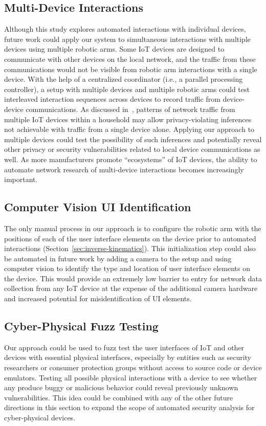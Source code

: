 \subsection{Multi-Device Interactions}
Although this study explores automated interactions with individual devices, future work could apply our system to simultaneous interactions with multiple devices using multiple robotic arms. 
Some IoT devices are designed to communicate with other devices on the local network, and the traffic from these communications would not be visible from robotic arm interactions with a single device. With the help of a centralized coordinator (i.e., a parallel processing controller), a setup with multiple devices and multiple robotic arms could test interleaved interaction sequences across devices to record traffic from device-device communications. 
As discussed in~\cite{apthorpe2019keeping}, patterns of network traffic from multiple IoT devices within a household may allow privacy-violating inferences not achievable with traffic from a single device alone. 
Applying our approach to multiple devices could test the possibility of such inferences and potentially reveal other privacy or security vulnerabilities related to local device communications as well. 
As more manufacturers promote ``ecosystems'' of IoT devices, the ability to automate network research of multi-device interactions becomes increasingly important. 

\subsection{Computer Vision UI Identification}
The only manual process in our approach is to configure the robotic arm with the positions of each of the user interface elements on the device prior to automated interactions (Section~\ref{sec:inverse-kinematics}). This initialization step could also be automated in future work by adding a camera to the setup and using computer vision to identify the type and location of user interface elements on the device. This would provide an extremely low barrier to entry for network data collection from any IoT device at the expense of the additional camera hardware and increased potential for misidentification of UI elements. 

\subsection{Cyber-Physical Fuzz Testing}
Our approach could be used to fuzz test the user interfaces of IoT and other devices with essential physical interfaces, especially by entities such as security researchers or consumer protection groups without access to source code or device emulators. 
Testing all possible physical interactions with a device to see whether any produce buggy or malicious behavior could reveal previously unknown vulnerabilities. This idea could be combined with any of the other future directions in this section to expand the scope of automated security analysis for cyber-physical devices. 
